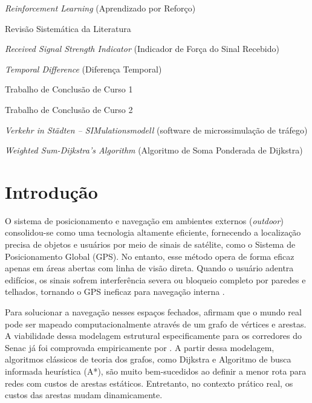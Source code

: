 \documentclass[
    12pt,                %
    openright,           %
    oneside,             %
    a4paper,             %
    english,             %
    brazil               %
]{abntex2}
\begin{document}
\begin{siglas}
  \item[RL] \textit{Reinforcement Learning} (Aprendizado por Reforço)
  \item[RSL] Revisão Sistemática da Literatura
  \item[RSSI] \textit{Received Signal Strength Indicator} (Indicador de Força do Sinal Recebido)
  \item[TD] \textit{Temporal Difference} (Diferença Temporal)
  \item[TCC1] Trabalho de Conclusão de Curso 1
  \item[TCC2] Trabalho de Conclusão de Curso 2
  \item[VISSIM] \textit{Verkehr in Städten -- SIMulationsmodell} (software de microssimulação de tráfego)
  \item[WSDA] \textit{Weighted Sum-Dijkstra's Algorithm} (Algoritmo de Soma Ponderada de Dijkstra)
\end{siglas}

\tableofcontents*
\cleardoublepage

\textual

\chapter{Introdução}
\label{cap:introducao}

O sistema de posicionamento e navegação em ambientes externos (\textit{outdoor}) consolidou-se como uma tecnologia altamente eficiente, fornecendo a localização precisa de objetos e usuários por meio de sinais de satélite, como o Sistema de Posicionamento Global (GPS). No entanto, esse método opera de forma eficaz apenas em áreas abertas com linha de visão direta. Quando o usuário adentra edifícios, os sinais sofrem interferência severa ou bloqueio completo por paredes e telhados, tornando o GPS ineficaz para navegação interna \cite{Chia2025,BarrosoBrito2025}. 

Para solucionar a navegação nesses espaços fechados,  afirmam que o mundo real pode ser mapeado computacionalmente através de um grafo de vértices e arestas. A viabilidade dessa modelagem estrutural especificamente para os corredores do Senac já foi comprovada empiricamente por . A partir dessa modelagem, algoritmos clássicos de teoria dos grafos, como Dijkstra e Algoritmo de busca informada heurística (A*), são muito bem-sucedidos ao definir a menor rota para redes com custos de arestas estáticos. Entretanto, no contexto prático real, os custos das arestas mudam dinamicamente.
\end{document}
